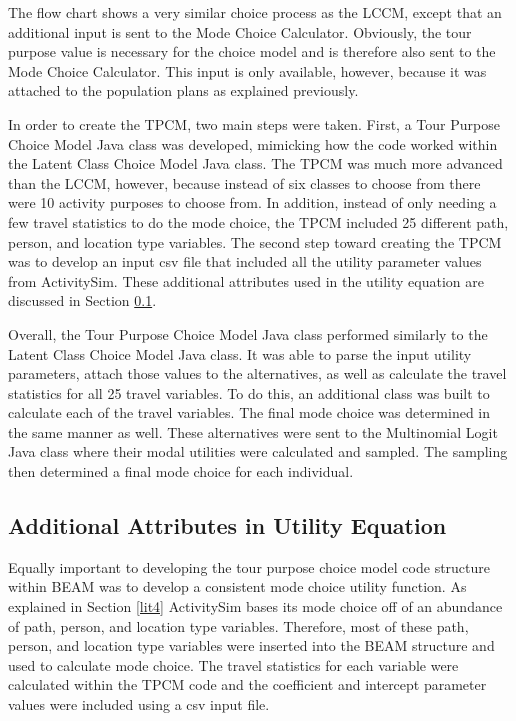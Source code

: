 \documentclass[12pt, oneside, openright]{byuthesis}
\begin{document}
The flow chart shows a very similar choice process as the LCCM, except that an additional input is sent to the Mode Choice Calculator. Obviously, the tour purpose value is necessary for the choice model and is therefore also sent to the Mode Choice Calculator. This input is only available, however, because it was attached to the population plans as explained previously.

In order to create the TPCM, two main steps were taken. First, a Tour Purpose Choice Model Java class was developed, mimicking how the code worked within the Latent Class Choice Model Java class. The TPCM was much more advanced than the LCCM, however, because instead of six classes to choose from there were 10 activity purposes to choose from. In addition, instead of only needing a few travel statistics to do the mode choice, the TPCM included 25 different path, person, and location type variables. The second step toward creating the TPCM was to develop an input csv file that included all the utility parameter values from ActivitySim. These additional attributes used in the utility equation are discussed in Section \ref{ute}.

Overall, the Tour Purpose Choice Model Java class performed similarly to the Latent Class Choice Model Java class. It was able to parse the input utility parameters, attach those values to the alternatives, as well as calculate the travel statistics for all 25 travel variables. To do this, an additional class was built to calculate each of the travel variables. The final mode choice was determined in the same manner as well. These alternatives were sent to the Multinomial Logit Java class where their modal utilities were calculated and sampled. The sampling then determined a final mode choice for each individual.

\hypertarget{ute}{%
\subsection{Additional Attributes in Utility Equation}\label{ute}}

Equally important to developing the tour purpose choice model code structure within BEAM was to develop a consistent mode choice utility function. As explained in Section \ref{lit4} ActivitySim bases its mode choice off of an abundance of path, person, and location type variables. Therefore, most of these path, person, and location type variables were inserted into the BEAM structure and used to calculate mode choice. The travel statistics for each variable were calculated within the TPCM code and the coefficient and intercept parameter values were included using a csv input file.
\end{document}
